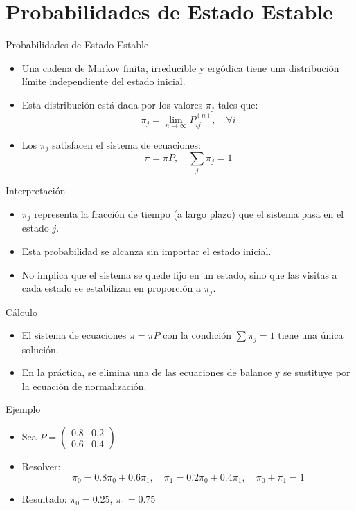 \documentclass{beamer}
\begin{document}
\section{Probabilidades de Estado Estable}

\begin{frame}{Probabilidades de Estado Estable}
\begin{itemize}
  \item Una cadena de Markov finita, irreducible y ergódica tiene una distribución límite independiente del estado inicial.
  \item Esta distribución está dada por los valores $\pi_j$ tales que:
  \[
  \pi_j = \lim_{n \to \infty} P_{ij}^{(n)}, \quad \forall i
  \]
  \item Los $\pi_j$ satisfacen el sistema de ecuaciones:
  \[
  \pi = \pi P, \quad \sum_j \pi_j = 1
  \]
\end{itemize}
\end{frame}

\begin{frame}{Interpretación}
\begin{itemize}
  \item $\pi_j$ representa la fracción de tiempo (a largo plazo) que el sistema pasa en el estado $j$.
  \item Esta probabilidad se alcanza sin importar el estado inicial.
  \item No implica que el sistema se quede fijo en un estado, sino que las visitas a cada estado se estabilizan en proporción a $\pi_j$.
\end{itemize}
\end{frame}

\begin{frame}{Cálculo}
\begin{itemize}
  \item El sistema de ecuaciones $\pi = \pi P$ con la condición $\sum \pi_j = 1$ tiene una única solución.
  \item En la práctica, se elimina una de las ecuaciones de balance y se sustituye por la ecuación de normalización.
\end{itemize}
\end{frame}

\begin{frame}{Ejemplo}
\begin{itemize}
  \item Sea $P = \begin{pmatrix} 0.8 & 0.2 \\ 0.6 & 0.4 \end{pmatrix}$
  \item Resolver:
  \[
  \pi_0 = 0.8\pi_0 + 0.6\pi_1, \quad \pi_1 = 0.2\pi_0 + 0.4\pi_1, \quad \pi_0 + \pi_1 = 1
  \]
  \item Resultado: $\pi_0 = 0.25$, $\pi_1 = 0.75$
\end{itemize}
\end{frame}
\end{document}
